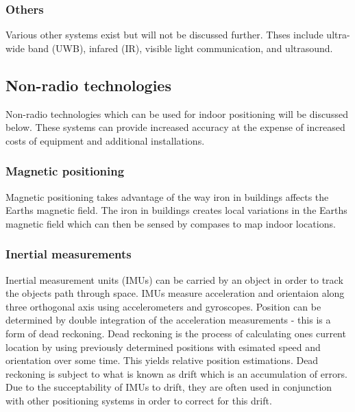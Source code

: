 \subsubsection{Others}
Various other systems exist but will not be discussed further. Thses include ultra-wide band (UWB), infared (IR), visible light communication, and ultrasound.

\subsection{Non-radio technologies}
Non-radio technologies which can be used for indoor positioning will be discussed below. These systems can provide increased accuracy at the expense of increased costs of equipment and additional installations.

\subsubsection{Magnetic positioning}
Magnetic positioning takes advantage of the way iron in buildings affects the Earths magnetic field. The iron in buildings creates local variations in the Earths magnetic field which can then be sensed by compases to map indoor locations.
\cite{supreeth_sudhakaran_geospatial_2014}

\subsubsection{Inertial measurements}
Inertial measurement units (IMUs) can be carried by an object in order to track the objects path through space. IMUs measure acceleration and orientaion along three orthogonal axis using accelerometers and gyroscopes. Position can be determined by double integration of the acceleration measurements - this is a form of dead reckoning. Dead reckoning is the process of calculating ones current location by using previously determined positions with esimated speed and orientation over some time. This yields relative position estimations. Dead reckoning is subject to what is known as drift which is an accumulation of errors. Due to the succeptability of IMUs to drift, they are often used in conjunction with other positioning systems in order to correct for this drift.

